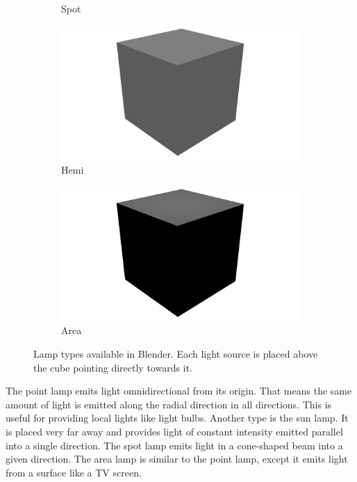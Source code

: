 \begin{figure}
\begin{subfigure}{0.19\textwidth}
		\caption{Spot}
	\end{subfigure}
	\begin{subfigure}{0.19\textwidth}
		\centering
		\includegraphics[width=\textwidth]{images/hemi.png}
		\caption{Hemi}
	\end{subfigure}
	\begin{subfigure}{0.19\textwidth}
		\centering
		\includegraphics[width=\textwidth]{images/area.png}
		\caption{Area}
	\end{subfigure}
	\caption[Lamp types available in Blender]{Lamp types available in Blender. Each light source is placed above the cube pointing directly towards it.}
	\label{fig:blender-lamps}
\end{figure}
The point lamp emits light omnidirectional from its origin.
That means the same amount of light is emitted along the radial direction in all directions.
This is useful for providing local lights like light bulbs.
Another type is the sun lamp.
It is placed very far away and provides light of constant intensity emitted parallel into a single direction.
The spot lamp emits light in a cone-shaped beam into a given direction.
The area lamp is similar to the point lamp, except it emits light from a surface like a TV screen.

